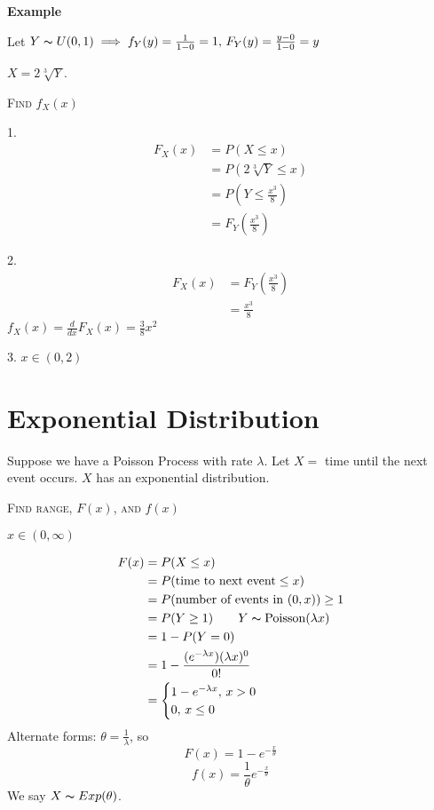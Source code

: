 \textbf{Example}

Let $ Y \thicksim U(0,1)\implies f_Y(y)=\frac{1}{1-0}=1,\,
    F_Y(y)=\frac{y-0}{1-0}=y $

$ X=2\sqrt[3]{Y} $.

\textsc{Find $ f_X(x) $}

1.
\begin{align*}
    F_X(x) & =P(X\le x)                        \\
           & =P\left(2\sqrt[3]{Y}\le x\right)  \\
           & =P\left(Y\le \frac{x^3}{8}\right) \\
           & =F_Y\left(\frac{x^3}{8} \right)
\end{align*}

2.
\begin{align*}
    F_X(x) & =F_Y\left(\frac{x^3}{8} \right) \\
           & =\frac{x^3}{8}
\end{align*}
$ f_X(x)=\frac{d}{dx}F_X(x)=\frac{3}{8}x^2 $

3. $ x\in(0,2) $

\section{Exponential Distribution}
Suppose we have a Poisson Process with rate $ \lambda $. Let
$ X= $ time until the next event occurs. $ X $ has an exponential distribution.

\textsc{Find range, $ F(x) $, and $ f(x) $}

$ x\in(0,\infty) $

\begin{align*}
    F(x) & =P(X\le x)                                     \\
         & =P(\text{time to next event}\le x)             \\
         & =P(\text{number of events in $ (0,x) $}) \ge 1 \\
         & =P(Y\ge 1)\qquad Y \thicksim \operatorname{Poisson}(\lambda x)   \\
         & =1-P(Y=0)                                      \\
         & =1-\frac{(e^{-\lambda x})(\lambda x)^0}{0!}    \\
         & =
    \begin{cases}
        1-e^{-\lambda x},\, x>0 \\
        0,\, x\le 0
    \end{cases}
\end{align*}
Alternate forms: $ \theta=\frac{1}{\lambda} $, so
\[ F(x)=1-e^{-\frac{x}{\theta}} \]
\[ f(x)=\frac{1}{\theta}e^{-\frac{x}{\theta}} \]
We say $ X \thicksim Exp(\theta) $.
